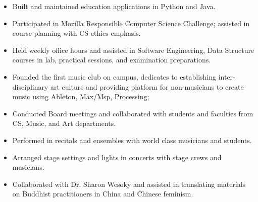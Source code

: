 \begin{itemize}
\item Built and maintained education applications in Python and Java.
\item Participated in Mozilla Responsible Computer Science Challenge; assisted in course planning with CS ethics emphasis.
\end{itemize}
\smallskip
{}
\begin{itemize}
\item Held weekly office hours and assisted in Software Engineering, Data Structure courses in lab, practical sessions, and examination preparations.
\end{itemize}
\smallskip
{}
\begin{itemize}
\item Founded the first music club on campus, dedicates to establishing inter-disciplinary art culture and providing platform for non-musicians to create music using Ableton, Max/Msp, Processing;
\item Conducted Board meetings and collaborated with students and faculties from CS, Music, and Art departments.
\end{itemize}
\smallskip
{}
\begin{itemize}
\item Performed in recitals and ensembles with world class musicians and students.
\item Arranged stage settings and lights in concerts with stage crews and musicians.
\end{itemize}
\smallskip
{}
\begin{itemize}
\item Collaborated with Dr. Sharon Wesoky and assisted in translating materials on Buddhist practitioners in China and Chinese feminism.
\end{itemize}
\smallskip



